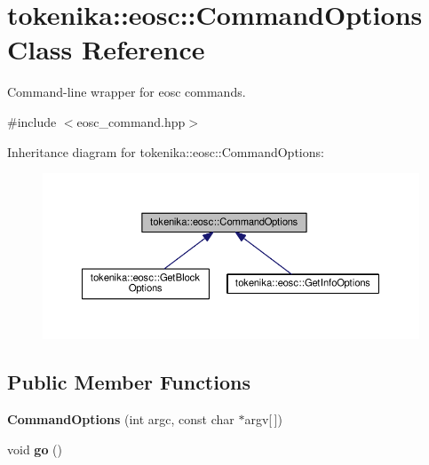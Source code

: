 \hypertarget{classtokenika_1_1eosc_1_1_command_options}{}\section{tokenika\+:\+:eosc\+:\+:Command\+Options Class Reference}
\label{classtokenika_1_1eosc_1_1_command_options}


Command-\/line wrapper for eosc commands.  




{\ttfamily \#include $<$eosc\+\_\+command.\+hpp$>$}



Inheritance diagram for tokenika\+:\+:eosc\+:\+:Command\+Options\+:\nopagebreak
\begin{figure}[H]
\begin{center}
\leavevmode
\includegraphics[width=350pt]{classtokenika_1_1eosc_1_1_command_options__inherit__graph}
\end{center}
\end{figure}
\subsection*{Public Member Functions}
\begin{DoxyCompactItemize}
\item 
\mbox{\label{classtokenika_1_1eosc_1_1_command_options_a61d20e4e3a9564c242eecfe814e96783}} 
{\bfseries Command\+Options} (int argc, const char $\ast$argv\mbox{[}$\,$\mbox{]})
\item 
\mbox{\label{classtokenika_1_1eosc_1_1_command_options_a4fa1c9defc45b139e415c79c43b15e5d}} 
void {\bfseries go} ()
\end{DoxyCompactItemize}
